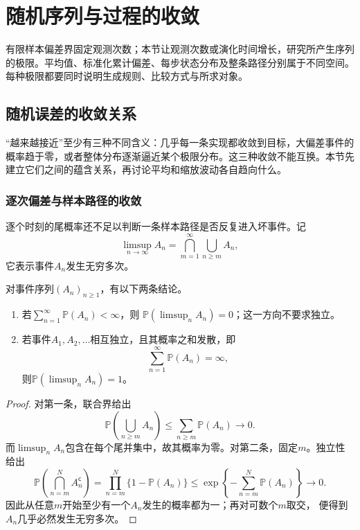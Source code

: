 \section{随机序列与过程的收敛}
\label{sec:rv-sequence-process-convergence}
有限样本偏差界固定观测次数；本节让观测次数或演化时间增长，研究所产生序列的极限。平均值、标准化累计偏差、每步状态分布及整条路径分别属于不同空间。每种极限都要同时说明生成规则、比较方式与所求对象。

\subsection{随机误差的收敛关系}
\label{sec:probability-random-convergence-asymptotics}
“越来越接近”至少有三种不同含义：几乎每一条实现都收敛到目标，大偏差事件的概率趋于零，或者整体分布逐渐逼近某个极限分布。这三种收敛不能互换。本节先建立它们之间的蕴含关系，再讨论平均和缩放波动各自趋向什么。

\subsubsection{逐次偏差与样本路径的收敛}
\label{sec:rv-numerical-convergence}
逐个时刻的尾概率还不足以判断一条样本路径是否反复进入坏事件。记
\[
  \limsup_{n\to\infty}A_n
  =
  \bigcap_{m=1}^{\infty}\bigcup_{n\geq m}A_n,
\]
它表示事件\(A_n\)发生无穷多次。
\begin{theorem}
  \label{thm:probability-borel-cantelli}
  对事件序列\((A_n)_{n\geq1}\)，有以下两条结论。
  \begin{enumerate}
    \item 若\(\sum_{n=1}^{\infty}\mathbb{P}(A_n)<\infty\)，则
    \(\mathbb{P}(\limsup_n A_n)=0\)；这一方向不要求独立。
    \item 若事件\(A_1,A_2,\ldots\)相互独立，且其概率之和发散，即
    \[
      \sum_{n=1}^{\infty}\mathbb{P}(A_n)=\infty,
    \]
    则\(\mathbb{P}(\limsup_n A_n)=1\)。
  \end{enumerate}
\end{theorem}

\begin{proof}
对第一条，联合界给出
\[
  \mathbb{P}\left(\bigcup_{n\geq m}A_n\right)
  \leq\sum_{n\geq m}\mathbb{P}(A_n)\longrightarrow0.
\]
而\(\limsup_n A_n\)包含在每个尾并集中，故其概率为零。对第二条，固定\(m\)。独立性
给出
\[
  \mathbb{P}\left(\bigcap_{n=m}^{N}A_n^{\mathsf c}\right)
  =
  \prod_{n=m}^{N}\{1-\mathbb{P}(A_n)\}
  \leq
  \exp\left\{-\sum_{n=m}^{N}\mathbb{P}(A_n)\right\}
  \longrightarrow0.
\]
因此从任意\(m\)开始至少有一个\(A_n\)发生的概率都为一；再对可数个\(m\)取交，
便得到\(A_n\)几乎必然发生无穷多次。
\end{proof}

